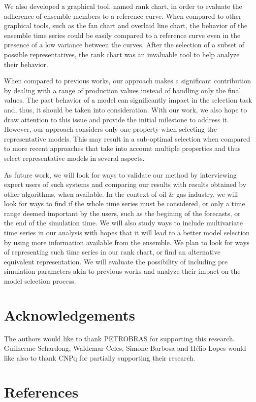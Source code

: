 \documentclass[final,5p,times,twocolumn]{elsarticle}
\begin{document}
We also developed a graphical tool, named rank chart, in order to evaluate the adherence of ensemble members to a reference curve. When compared to other graphical tools, such as the fan chart and overlaid line chart, the behavior of the ensemble time series could be easily compared to a reference curve even in the presence of a low variance between the curves. After the selection of a subset of possible representatives, the rank chart was an invaluable tool to help analyze their behavior.

When compared to previous works, our approach makes a significant contribution by dealing with a range of production values instead of handling only the final values. The past behavior of a model can significantly impact in the selection task and, thus, it should be taken into consideration. With our work, we also hope to draw attention to this issue and provide the initial milestone to address it. However, our approach considers only one property when selecting the representative models. This may result in a sub-optimal selection when compared to more recent approaches \cite{selection-sarma:2013, meira:2016} that take into account multiple properties and thus select representative models in several aspects.

As future work, we will look for ways to validate our method by interviewing expert users of such systems and comparing our results with results obtained by other algorithms, when available. In the context of oil \& gas industry, we will look for ways to find if the whole time series must be considered, or only a time range deemed important by the users, such as the begining of the forecasts, or the end of the simulation time. We will also study ways to include multivariate time series in our analysis with hopes that it will lead to a better model selection by using more information available from the ensemble. We plan to look for ways of representing such time series in our rank chart, or find an alternative equivalent representation. We will evaluate the possibility of including pre simulation parameters akin to previous works and analyze their impact on the model selection process.


\section*{Acknowledgements}
The authors would like to thank PETROBRAS for supporting this research. Guilherme Schardong, Waldemar Celes, Simone Barbosa and H\'elio Lopes would like also to thank CNPq for partially supporting their research.




\section*{References}
 

\end{document}
